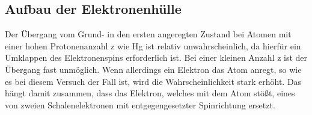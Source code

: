 \subsection{Aufbau der Elektronenhülle}
Der Übergang vom Grund- in den ersten angeregten Zustand bei Atomen mit einer hohen Protonenanzahl z wie Hg ist relativ unwahrscheinlich,
da hierfür ein Umklappen des Elektronenspins erforderlich ist.
Bei einer kleinen Anzahl z ist der Übergang fast unmöglich.
Wenn allerdings ein Elektron das Atom anregt, so wie es bei diesem Versuch der Fall ist,
wird die Wahrscheinlichkeit stark erhöht.
Das hängt damit zusammen, dass das Elektron, welches mit dem Atom stößt, eines von zweien Schalenelektronen mit entgegengesetzter Spinrichtung ersetzt.